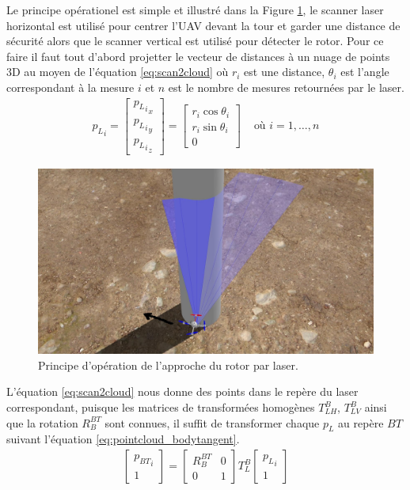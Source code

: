 Le principe opérationel est simple et illustré dans la Figure \ref{fig:approach}, le scanner laser horizontal est utilisé pour centrer l'UAV devant la tour et garder une distance de sécurité alors que le scanner vertical est utilisé pour détecter le rotor. Pour ce faire il faut tout d'abord projetter le vecteur de distances à un nuage de points 3D au moyen de l'équation \ref{eq:scan2cloud} où $r_i$ est une distance, $\theta_i$ est l'angle correspondant à la mesure $i$ et $n$ est le nombre de mesures retournées par le laser.
\begin{align}
  {p_{L}}_i = \begin{bmatrix}
    {{p_L}_i}_x \\
    {{p_L}_i}_y \\
    {{p_L}_i}_z
  \end{bmatrix} = \begin{bmatrix}r_i \cos \theta_i \\ r_i \sin \theta_i \\ 0 \end{bmatrix} & \text{ où } i=1,\ldots,n
    \label{eq:scan2cloud}
\end{align}
\begin{figure}[htp]
  \centering
  \includegraphics[width=0.8\linewidth]{images/principe_operation.jpg}
  \caption{Principe d'opération de l'approche du rotor par laser.}
  \label{fig:approach}
\end{figure}
L'équation \ref{eq:scan2cloud} nous donne des points dans le repère du laser correspondant, puisque les matrices de transformées homogènes $T_{LH}^B$, $T_{LV}^B$ ainsi que la rotation $R_B^{BT}$ sont connues, il suffit de transformer chaque $p_L$ au repère ${BT}$ suivant l'équation \ref{eq:pointcloud_bodytangent}.
\begin{align}
  \begin{bmatrix}{p_{BT}}_i \\ 1\end{bmatrix} = \begin{bmatrix}
    R_B^{BT} & 0 \\
    0 & 1
  \end{bmatrix} T_{L}^B\begin{bmatrix}{p_{L}}_i \\ 1\end{bmatrix}
  \label{eq:pointcloud_bodytangent}
\end{align}

